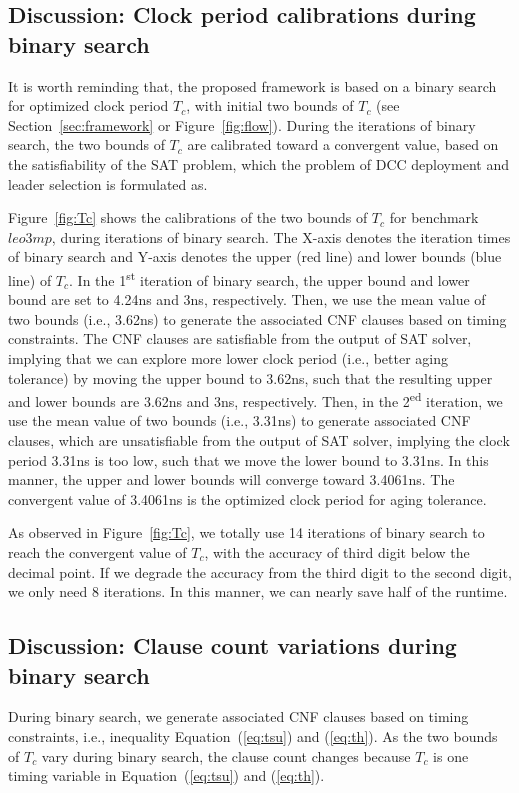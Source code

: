 \subsection{Discussion: Clock period calibrations during binary search}

It is worth reminding that, the proposed framework is based on a binary search for optimized clock period $T_{c}$, with initial two bounds of $T_{c}$ (see Section~\ref{sec:framework} or Figure~\ref{fig:flow}). During the iterations of binary search, the two bounds of $T_{c}$ are calibrated toward a convergent value, based on the satisfiability of the SAT problem, which the problem of DCC deployment and leader selection is formulated as.

Figure~\ref{fig:Tc} shows the calibrations of the two bounds of $T_{c}$ for benchmark $leo3mp$, during iterations of binary search. The X-axis denotes the iteration times of binary search and Y-axis denotes the upper (red line) and lower bounds (blue line) of $T_{c}$. In the 1\textsuperscript{st} iteration of binary search, the upper bound and lower bound are set to 4.24ns and 3ns, respectively. Then, we use the mean value of two bounds (i.e., 3.62ns) to generate the associated CNF clauses based on timing constraints. The CNF clauses are satisfiable from the output of SAT solver, implying that we can explore more lower clock period (i.e., better aging tolerance) by moving the upper bound to 3.62ns, such that the resulting upper and lower bounds are 3.62ns and 3ns, respectively. Then, in the 2\textsuperscript{ed} iteration, we use the mean value of two bounds (i.e., 3.31ns) to generate associated CNF clauses, which are unsatisfiable from the output of SAT solver, implying the clock period 3.31ns is too low, such that we move the lower bound to 3.31ns. In this manner, the upper and lower bounds will converge toward 3.4061ns. The convergent value of 3.4061ns is the optimized clock period for aging tolerance.

As observed in Figure~\ref{fig:Tc}, we totally use 14 iterations of binary search to reach the convergent value of $T_{c}$, with the accuracy of third digit below the decimal point. If we degrade the accuracy from the third digit to the second digit, we only need 8 iterations. In this manner, we can nearly save half of the runtime. 
\subsection{Discussion: Clause count variations during binary search}

During binary search, we generate associated CNF clauses based on timing constraints, i.e., inequality Equation~(\ref{eq:tsu}) and (\ref{eq:th}). 
As the two bounds of $T_{c}$ vary during binary search, the clause count changes because $T_{c}$ is one timing variable in Equation~(\ref{eq:tsu}) and (\ref{eq:th}). 

